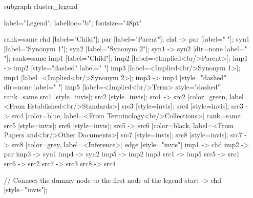 \documentclass{article}
\begin{document}
{subgraph cluster_legend {

    label="Legend";
    labelloc="b";
    fontsize="48pt"

    {
        rank=same
        chd [label="Child"];
        par [label="Parent"];
        chd -> par [label="                "];
        syn1 [label="Synonym 1"];
        syn2 [label="Synonym 2"];
        syn1 -> syn2 [dir=none label="                "];
    }
    {
        rank=same
        imp1 [label="Child"];
        imp2 [label=<Implied<br/>Parent>];
        imp1 -> imp2 [style="dashed" label="                "]
        imp3 [label=<Implied<br/>Synonym 1>];
        imp4 [label=<Implied<br/>Synonym 2>];
        imp3 -> imp4 [style="dashed" dir=none label="                "]
    }
        imp5 [label=<Implied<br/>Term> style="dashed"]
{
rank=same
src1 [style=invis];
src2 [style=invis];
src1 -> src2 [color=green, label=<From Established<br/>Standards>]
src3 [style=invis];
src4 [style=invis];
src3 -> src4 [color=blue, label=<From Terminology<br/>Collections>]
}
{
rank=same
src5 [style=invis];
src6 [style=invis];
src5 -> src6 [color=black, label=<From Papers and<br/>Other Documents>]
src7 [style=invis];
src8 [style=invis];
src7 -> src8 [color=grey, label=<Inference>]
}
edge [style="invis"]
imp1 -> chd
imp2 -> par
imp3 -> syn1
imp4 -> syn2
imp5 -> { imp2 imp3 }
src1 -> imp5
src5 -> src1
src6 -> src2
src7 -> src3
src8 -> src4
}

// Connect the dummy node to the first node of the legend
start -> chd [style="invis"];
}
\end{document}
